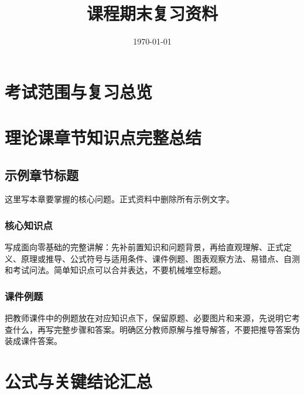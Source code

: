 \documentclass[12pt,a4paper]{ctexart}
\title{课程期末复习资料}
\author{}
\date{\today}
\begin{document}
\maketitle
\tableofcontents
\newpage

\section{考试范围与复习总览}


\section{理论课章节知识点完整总结}


\subsection{示例章节标题}

\begin{notebox}[本章目标]
这里写本章要掌握的核心问题。正式资料中删除所有示例文字。
\end{notebox}

\subsubsection{核心知识点}

写成面向零基础的完整讲解：先补前置知识和问题背景，再给直观理解、正式定义、原理或推导、公式符号与适用条件、课件例题、图表观察方法、易错点、自测和考试问法。简单知识点可以合并表达，不要机械堆空标题。

\subsubsection{课件例题}

把教师课件中的例题放在对应知识点下，保留原题、必要图片和来源，先说明它考查什么，再写完整步骤和答案。明确区分教师原解与推导解答，不要把推导答案伪装成课件答案。

\section{公式与关键结论汇总}
\end{document}
